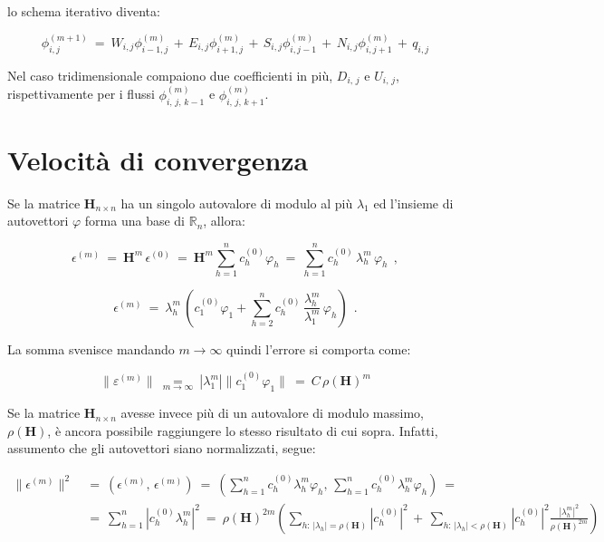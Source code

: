 lo schema iterativo diventa:

\begin{equation*}
	\phi_{i,j}^{(m+1)}\ =\
	W_{i,j}\phi_{i-1,j}^{(m)}\, +\,
	E_{i,j}\phi_{i+1,j}^{(m)}\, +\,
	S_{i,j}\phi_{i,j-1}^{(m)}\, +\,
	N_{i,j}\phi_{i,j+1}^{(m)}\, +\,
	q_{i,j}
\end{equation*}

Nel caso tridimensionale compaiono due coefficienti in più, $D_{i,\, j}$ e $U_{i,\, j}$, rispettivamente per i flussi $\phi^{(m)}_{i,\, j,\, k-1}$ e $\phi^{(m)}_{i,\, j,\, k+1}$.


%
%
%
\section{Velocità di convergenza}

Se la matrice $\mathbf H_{n\times n}$ ha un singolo autovalore di modulo al più $\lambda_1$ ed l'insieme di autovettori $\varphi$ forma una base di $\mathbb{R}_n$, allora:

\[\epsilon^{(m)}\ =\ \mathbf H^m\, \epsilon^{(0)}\ =\ 
\mathbf H^m \sum_{h=1}^n c_h^{(0)} \varphi_h\ =\ 
\sum_{h=1}^n c_h^{(0)}\, \lambda^m_h\, \varphi_h\ \ , \]

\[\epsilon^{(m)}\ =\ \lambda^m_h\, 
\left(c_1^{(0)} \varphi_1 + \sum_{h=2}^n c_h^{(0)}\, \frac{\lambda^m_h}{\lambda_1^m}\, \varphi_h\right)\ \ .
\]

La somma svenisce mandando $m\rightarrow \infty$ quindi l'errore si comporta come:

\begin{equation*}
	\|\varepsilon^{(m)}\| \ \underset{m\rightarrow \infty}{=}\  
	|\lambda^m_1| \|c_1^{(0)} \varphi_1\|\ =\ C\, \rho(\mathbf H)^m
\end{equation*}



Se la matrice $\mathbf H_{n\times n}$ avesse invece più di un autovalore di modulo massimo, $\rho(\mathbf H)$, è ancora possibile raggiungere lo stesso risultato di cui sopra. Infatti, assumento che gli autovettori siano normalizzati, segue:

\[\begin{aligned}
	\|\epsilon^{(m)}\|^2\ 
	&=\ \left(\epsilon^{(m)},\, \epsilon^{(m)}\right)\ =\
	\left(\sum_{h=1}^n c_h^{(0)}\lambda^m_h \varphi_h,\,\sum_{h=1}^n c_h^{(0)}\lambda^m_h \varphi_h\right) \ =\\
	&=\ \sum_{h=1}^n |c_h^{(0)}\lambda^m_h|^2\ =\ 
	\rho(\mathbf{H})^{2m} \left(\sum_{h:\, |\lambda_h|=\rho(\mathbf H)} |c_h^{(0)} |^2\, +\, \sum_{h:\, |\lambda_h|<\rho(\mathbf H)} |c_h^{(0)} |^2\frac{|\lambda_h^m|^2}{\rho(\mathbf H)^{2m}}\right) 
\end{aligned}\]


